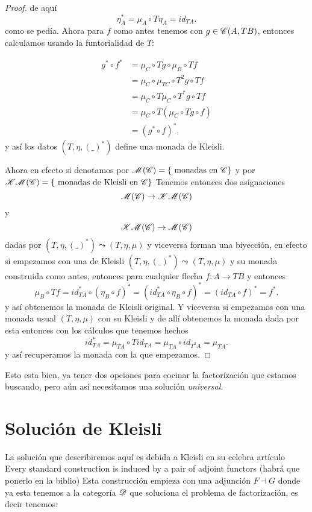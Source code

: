 \documentclass{comunicaciones}
\begin{document}
\begin{proof}
 de aquí \[\eta_{A}^{*}=\mu_{A}\circ T\eta_{A}=id_{TA}.\]
como se pedía.
Ahora para $f$ como antes tenemos con $g\in\EuScript{C}(A,TB)$, entonces calculamos usando la funtorialidad de $T$: 


\[
    \begin{aligned}
        g^{*}\circ f^{*}
        &= \mu_{C}\circ Tg\circ\mu_{B}\circ Tf \\
        &= \mu_{C}\circ\mu_{TC}\circ T^{2}g\circ Tf\\
        &= \mu_{C}\circ T\mu_{C}\circ T^{*}g\circ Tf \\
        &=\mu_{C}\circ T(\mu_{C}\circ Tg\circ f)\\
        &=(g^{*}\circ f)^{*},
        \end{aligned}\]
y así los datos $(T,\eta,(\_)^{*})$ define una monada de Kleisli.

Ahora en efecto si denotamos por $\mathcal{M}(\EuScript{C})=\{\text{ monadas en }\EuScript{C}\}$ y por $\mathcal{K}\mathcal{M}(\EuScript{C})=\{\text{ monadas de Kleisli en }\EuScript{C}\}$
Tenemos entonces dos asignaciones \[\mathcal{M}(\EuScript{C})\rightarrow \mathcal{K}\mathcal{M}(\EuScript{C})\] y \[\mathcal{K}\mathcal{M}(\EuScript{C})\rightarrow \mathcal{M}(\EuScript{C})\] dadas por 
$(T,\eta,(\_)^{*})\leadsto (T,\eta,\mu)$ y viceversa forman una biyección, en efecto si empezamos con una de Kleisli $(T,\eta,(\_)^{*})\leadsto (T,\eta,\mu)$ y su monada construida como antes,  entonces para cualquier flecha $f\colon A\rightarrow TB$ y entonces \[\mu_{B}\circ Tf=id^{*}_{TA}\circ(\eta_{B}\circ f)^{*}=(id^{*}_{TA}\circ\eta_{B}\circ f)^{*}=(id_{TA}\circ f)^{*}=f^{*}.\]
y así obtenemos la monada de Kleisli original. 
Y viceversa si empezamos con una monada usual $(T,\eta,\mu)$ con su Kleisli y de allí obtenemos la monada dada por esta entonces con los cálculos que tenemos hechos \[id^{*}_{TA}=\mu_{TA}\circ Tid_{TA}=\mu_{TA}\circ id_{T^{2}A}=\mu_{TA}.\]
y así recuperamos la monada con la que empezamos.

\end{proof}   

Esto esta bien, ya tener dos opciones para cocinar la factorización que estamos buscando, pero aún así necesitamos una solución \emph{universal}.

\section{Solución de Kleisli}\label{SOLKLEI}

La solución que describiremos aquí es debida a Kleisli en su celebra artículo Every standard construction is induced by a pair of adjoint functors (habrá que ponerlo en la biblio)
Esta construcción empieza con una adjunción $F\dashv G$ donde ya esta tenemos a la categoría $\EuScript{D}$ que soluciona el problema de factorización, es decir tenemos:
\end{document}
